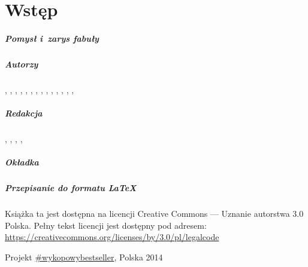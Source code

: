\chapter{Wstęp}

\paragraph{Pomysł i~zarys fabuły}

\vfill

\paragraph{Autorzy}
, 
, 
, 
, 
, 
, 
, 
, 
, 
, 
, 
, 
, 
, 

\vfill

\paragraph{Redakcja}
, 
, 
, 
, 

\vfill

\paragraph{Okładka}

\vfill

\paragraph{Przepisanie do formatu \LaTeX}

\vfill

\begin{center}
	\noindent
	\footnotesize Książka ta jest dostępna na licencji Creative Commons --- Uznanie autorstwa 3.0 Polska. Pełny tekst 
	licencji jest dostępny pod adresem: \url{https://creativecommons.org/licenses/by/3.0/pl/legalcode}

	\vspace{6pt}

	\normalsize\cc\ccby Projekt \href{http://www.wykop.pl/tag/wykopowybestseller/}{\#wykopowybestseller}, Polska 2014
\end{center}
